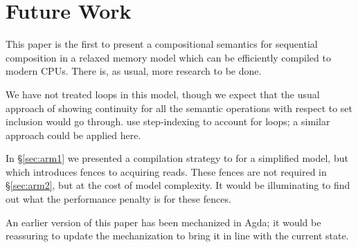\section{Future Work}

This paper is the first to present a compositional semantics for
sequential composition in a relaxed memory model which can be
efficiently compiled to modern CPUs. There is, as usual, more research
to be done.

We have not treated loops in this model, though we expect that the usual
approach of showing continuity for all the semantic operations with respect to set inclusion
would go through. \citet{DBLP:conf/esop/PaviottiCPWOB20} use step-indexing to account for
loops; a similar approach could be applied here.

In \S\ref{sec:arm1} we presented a compilation strategy to \armeight{}
for a simplified model, but which introduces fences to acquiring
reads. These fences are not required in \S\ref{sec:arm2}, but at the
cost of model complexity. It would be illuminating to find out what
the performance penalty is for these fences.

An earlier version of this paper has been mechanized in Agda; it would be
reassuring to update the mechanization to bring it in line with the current state.




